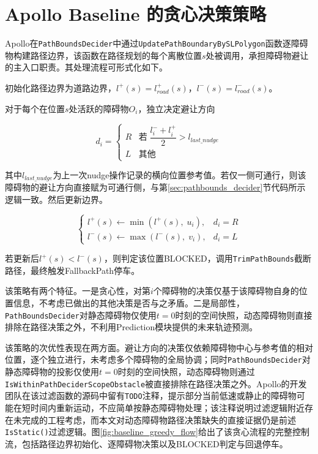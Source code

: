 \section{Apollo Baseline 的贪心决策策略}
Apollo在\texttt{PathBoundsDecider}中通过\texttt{UpdatePathBoundaryBySLPolygon}函数逐障碍物构建路径边界，该函数在路径规划的每个离散位置$s$处被调用，承担障碍物避让的主入口职责。其处理流程可形式化如下。

初始化路径边界为道路边界，$l^{+}(s) = l_{road}^{+}(s)$，$l^{-}(s) = l_{road}^{-}(s)$。

对于每个在位置$s$处活跃的障碍物$O_i$，独立决定避让方向

\begin{equation}
    d_i = \begin{cases}
        R & \text{若} \; \dfrac{l_i^{-} + l_i^{+}}{2} > l_{last\_nudge} \\[0.8em]
        L & \text{其他}
    \end{cases}
    \label{eq:baseline_decision}
\end{equation}

其中$l_{last\_nudge}$为上一次nudge操作记录的横向位置参考值。若仅一侧可通行，则该障碍物的避让方向直接赋为可通行侧，与第\ref{sec:pathbounds_decider}节代码所示逻辑一致。然后更新边界。

\begin{equation}
\begin{cases}
l^{+}(s) \leftarrow \min(l^{+}(s),\; u_i), & d_i = R \\
l^{-}(s) \leftarrow \max(l^{-}(s),\; v_i), & d_i = L
\end{cases}
\end{equation}

若更新后$l^{+}(s) < l^{-}(s)$，则判定该位置BLOCKED，调用\texttt{TrimPathBounds}截断路径，最终触发FallbackPath停车。

该策略有两个特征。一是贪心性，对第$i$个障碍物的决策仅基于该障碍物自身的位置信息，不考虑已做出的其他决策是否与之矛盾。二是局部性，\texttt{PathBoundsDecider}对静态障碍物仅使用$t{=}0$时刻的空间快照，动态障碍物则直接排除在路径决策之外，不利用Prediction模块提供的未来轨迹预测。

该策略的次优性表现在两方面。避让方向的决策仅依赖障碍物中心与参考值的相对位置，逐个独立进行，未考虑多个障碍物的全局协调；同时\texttt{PathBoundsDecider}对静态障碍物的投影仅使用$t{=}0$时刻的空间快照，动态障碍物则通过\texttt{IsWithinPathDeciderScopeObstacle}被直接排除在路径决策之外。Apollo的开发团队在该过滤函数的源码中留有\texttt{TODO}注释，提示部分当前低速或静止的障碍物可能在短时间内重新运动，不应简单按静态障碍物处理；该注释说明过滤逻辑附近存在未完成的工程考虑，而本文对动态障碍物路径决策缺失的直接证据仍是前述\texttt{IsStatic()}过滤逻辑。图\ref{fig:baseline_greedy_flow}给出了该贪心流程的完整控制流，包括路径边界初始化、逐障碍物决策以及BLOCKED判定与回退停车。

